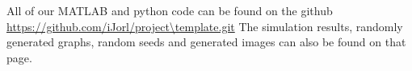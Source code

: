 All of our MATLAB and python code can be found on the github \url{https://github.com/iJorl/project\template.git}
The simulation results, randomly generated graphs, random seeds and generated images can also be found on that page.